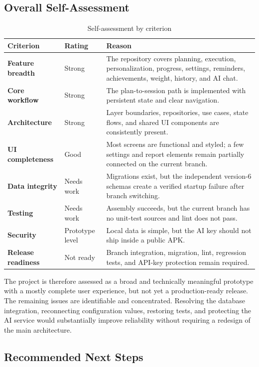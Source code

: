 \subsection{Overall Self-Assessment}

\begin{table}[ht]
\centering
\caption{Self-assessment by criterion}
\label{tab:self-assessment}
\begin{tabularx}{\textwidth}{>{\bfseries}p{} p{} X}
\toprule
Criterion & Rating & Reason \\
\midrule
Feature breadth & Strong & The repository covers planning, execution, personalization, progress, settings, reminders, achievements, weight, history, and AI chat. \\
Core workflow & Strong & The plan-to-session path is implemented with persistent state and clear navigation. \\
Architecture & Strong & Layer boundaries, repositories, use cases, state flows, and shared UI components are consistently present. \\
UI completeness & Good & Most screens are functional and styled; a few settings and report elements remain partially connected on the current branch. \\
Data integrity & Needs work & Migrations exist, but the independent version-6 schemas create a verified startup failure after branch switching. \\
Testing & Needs work & Assembly succeeds, but the current branch has no unit-test sources and lint does not pass. \\
Security & Prototype level & Local data is simple, but the AI key should not ship inside a public APK. \\
Release readiness & Not ready & Branch integration, migration, lint, regression tests, and API-key protection remain required. \\
\bottomrule
\end{tabularx}
\end{table}

The project is therefore assessed as a broad and technically meaningful prototype with a mostly complete user experience, but not yet a production-ready release. The remaining issues are identifiable and concentrated. Resolving the database integration, reconnecting configuration values, restoring tests, and protecting the AI service would substantially improve reliability without requiring a redesign of the main architecture.

\subsection{Recommended Next Steps}

